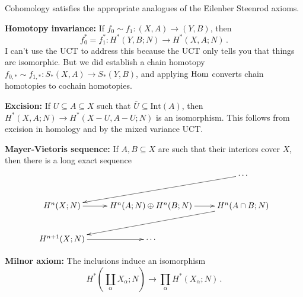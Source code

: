 Cohomology satisfies the appropriate analogues of the Eilenber Steenrod axioms.

\noindent
\textbf{Homotopy invariance:}
If $f_0\sim f_1:(X,A)\to (Y,B)$, then 
\[
f_0^*=f_1^*:H^\ast(Y,B;N)\to H^\ast(X,A;N)\,.
\]
I can't use the UCT to address this because the UCT only tells you that things are isomorphic. But we did establish a chain homotopy $f_{0,\ast}\sim f_{1,\ast}:S_\ast(X,A)\to S_\ast(Y,B)$, and applying $\operatorname{Hom}$ converts chain homotopies to cochain homotopies. 

\noindent
\textbf{Excision:} If $U\subseteq A\subseteq X$ such that $\overline{U}\subseteq\mathrm{Int}(A)$, then $ H^\ast(X,A;N)\to H^\ast(X-U,A-U;N)$ is an isomorphism. This follows from excision in homology and by the mixed variance UCT.

\noindent
\textbf{Mayer-Vietoris sequence:} If $A,B\subseteq X$ are such that their interiors cover $X$, then there is a long exact sequence
\begin{equation*}
\xymatrix{ & & \cdots\ar[dll]\\
 H^n(X;N)\ar[r] & H^n(A;N)\oplus H^n(B;N)\ar[r] & H^n(A\cap B;N)\ar[dll]\\
 H^{n+1}(X;N)\ar[r] & \cdots & }
\end{equation*}

\noindent
\textbf{Milnor axiom:} The inclusions induce an isomorphism
\[
H^*(\coprod_\alpha X_\alpha;N)\to \prod_\alpha H^*(X_\alpha;N)\,.
\]





